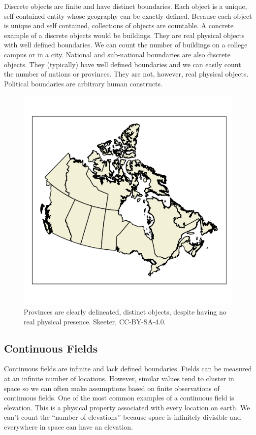 \documentclass[
]{book}
\begin{document}
Discrete objects are finite and have distinct boundaries. Each object is a unique, self contained entity whose geography can be exactly defined. Because each object is unique and self contained, collections of objects are countable. A concrete example of a discrete objects would be buildings. They are real physical objects with well defined boundaries. We can count the number of buildings on a college campus or in a city. National and sub-national boundaries are also discrete objects. They (typically) have well defined boundaries and we can easily count the number of nations or provinces. They are not, however, real physical objects. Political boundaries are arbitrary human constructs.

\begin{figure}
\includegraphics[width=0.75\linewidth]{images/03-vector} \caption{Provinces are clearly delineated, distinct objects, despite having no real physical presence. Skeeter, CC-BY-SA-4.0.}\label{fig:3-vector}
\end{figure}

\hypertarget{continuous-fields}{%
\subsection{Continuous Fields}\label{continuous-fields}}

Continuous fields are infinite and lack defined boundaries. Fields can be measured at an infinite number of locations. However, similar values tend to cluster in space so we can often make assumptions based on finite observations of continuous fields. One of the most common examples of a continuous field is elevation. This is a physical property associated with every location on earth. We can't count the ``number of elevations'' because space is infinitely divisible and everywhere in space can have an elevation.
\end{document}
